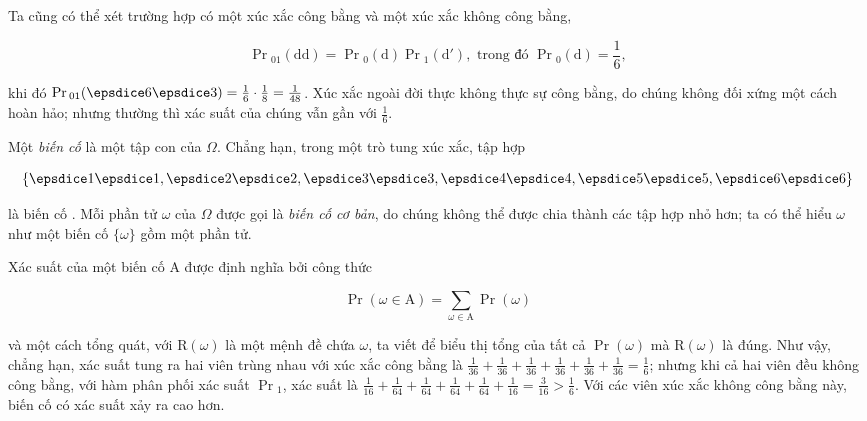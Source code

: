 Ta cũng có thể xét trường hợp có một xúc xắc công bằng và một xúc xắc không công bằng,

\begin{equation}\label{eq:8.3}
    \Pr\mathrm{}_{01}( \mathrm{d} \mathrm{d} ) = \Pr\mathrm{}_0( \mathrm{d} ) \Pr\mathrm{}_1( \mathrm{d'} ), \text{ trong đó } \Pr\mathrm{}_0( \mathrm{d} ) = \frac{1}{6},
\end{equation}

khi đó $\Pr\mathrm{}_{01}( \vcdice{6} \vcdice{3} ) = \frac{1}{6} \cdot \frac{1}{8} = \frac{1}{48}$.
Xúc xắc ngoài đời thực không thực sự công bằng, do chúng không đối xứng một cách hoàn hảo; nhưng thường thì xác suất của chúng vẫn gần với $\frac{1}{6}$.

Một \textit{biến cố} là một tập con của $\Omega$.
Chẳng hạn, trong một trò tung xúc xắc, tập hợp

\begin{equation*}
    \{ \vcdice{1} \vcdice{1}, \vcdice{2} \vcdice{2}, \vcdice{3} \vcdice{3}, \vcdice{4} \vcdice{4}, \vcdice{5} \vcdice{5}, \vcdice{6} \vcdice{6} \}
\end{equation*}

là biến cố .
Mỗi phần tử $\omega$ của $\Omega$ được gọi là \textit{biến cố cơ bản}, do chúng không thể được chia thành các tập hợp nhỏ hơn; ta có thể hiểu $\omega$ như một biến cố $\{ \omega \}$ gồm một phần tử.

Xác suất của một biến cố $\mathrm{A}$ được định nghĩa bởi công thức

\begin{equation}\label{eq:8.4}
    \Pr( \omega \in \mathrm{A} ) = \sum_{\omega \in \mathrm{A}} \Pr( \omega )
\end{equation}

và một cách tổng quát, với $\mathrm{R}( \omega )$ là một mệnh đề chứa $\omega$, ta viết  để biểu thị tổng của tất cả $\Pr( \omega )$ mà $\mathrm{R}( \omega )$ là đúng.
Như vậy, chẳng hạn, xác suất tung ra hai viên trùng nhau với xúc xắc công bằng là $\frac{1}{36} + \frac{1}{36} + \frac{1}{36} + \frac{1}{36} + \frac{1}{36} + \frac{1}{36} = \frac{1}{6}$; nhưng khi cả hai viên đều không công bằng, với hàm phân phối xác suất $\Pr\mathrm{}_1$, xác suất là $\frac{1}{16} + \frac{1}{64} + \frac{1}{64} + \frac{1}{64} + \frac{1}{64} + \frac{1}{16} = \frac{3}{16} > \frac{1}{6}$.
Với các viên xúc xắc không công bằng này, biến cố  có xác suất xảy ra cao hơn.